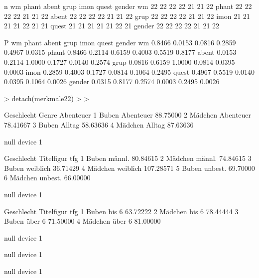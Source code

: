 \begin{Schunk}
\begin{Soutput}
n
       wm phant abent grup imon quest gender
wm     22    22    22   22   21    21     22
phant  22    22    22   22   21    21     22
abent  22    22    22   22   21    21     22
grup   22    22    22   22   21    21     22
imon   21    21    21   21   22    21     21
quest  21    21    21   21   21    22     21
gender 22    22    22   22   21    21     22

P
       wm     phant  abent  grup   imon   quest  gender
wm            0.8466 0.0153 0.0816 0.2859 0.4967 0.0315
phant  0.8466        0.2114 0.6159 0.4003 0.5519 0.8177
abent  0.0153 0.2114        1.0000 0.1727 0.0140 0.2574
grup   0.0816 0.6159 1.0000        0.0814 0.0395 0.0003
imon   0.2859 0.4003 0.1727 0.0814        0.1064 0.2495
quest  0.4967 0.5519 0.0140 0.0395 0.1064        0.0026
gender 0.0315 0.8177 0.2574 0.0003 0.2495 0.0026       
\end{Soutput}
\begin{Sinput}
> detach(merkmale22)
> 
> 
\end{Sinput}
\end{Schunk}


















\begin{Schunk}
\begin{Soutput}
  Geschlecht     Genre Abenteuer
1      Buben Abenteuer  88.75000
2    Mädchen Abenteuer  78.41667
3      Buben    Alltag  58.63636
4    Mädchen    Alltag  87.63636
\end{Soutput}
\begin{Soutput}
null device 
          1 
\end{Soutput}
\begin{Soutput}
  Geschlecht Titelfigur       tfg
1      Buben     männl.  80.84615
2    Mädchen     männl.  74.84615
3      Buben   weiblich  36.71429
4    Mädchen   weiblich 107.28571
5      Buben    unbest.  69.70000
6    Mädchen    unbest.  66.00000
\end{Soutput}
\begin{Soutput}
null device 
          1 
\end{Soutput}
\begin{Soutput}
  Geschlecht Titelfigur      tfg
1      Buben      bis 6 63.72222
2    Mädchen      bis 6 78.44444
3      Buben     über 6 71.50000
4    Mädchen     über 6 81.00000
\end{Soutput}
\begin{Soutput}
null device 
          1 
\end{Soutput}
\begin{Soutput}
null device 
          1 
\end{Soutput}
\begin{Soutput}
null device 
          1 
\end{Soutput}
\end{Schunk}






